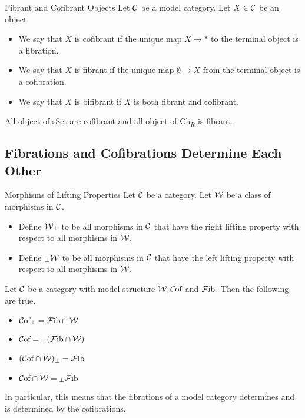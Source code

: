 \documentclass[a4paper]{article}
\begin{document}
\begin{defn}{Fibrant and Cofibrant Objects}{} Let $\mathcal{C}$ be a model category. Let $X\in\mathcal{C}$ be an object. 
\begin{itemize}
\item We say that $X$ is cofibrant if the unique map $X\to\ast$ to the terminal object is a fibration. 
\item We say that $X$ is fibrant if the unique map $\emptyset\to X$ from the terminal object is a cofibration. 
\item We say that $X$ is bifibrant if $X$ is both fibrant and cofibrant. 
\end{itemize}
\end{defn}

All object of sSet are cofibrant and all object of $\text{Ch}_R$ is fibrant. 

\subsection{Fibrations and Cofibrations Determine Each Other}
\begin{defn}{Morphisms of Lifting Properties}{} Let $\mathcal{C}$ be a category. Let $\mathcal{W}$ be a class of morphisms in $\mathcal{C}$. 
\begin{itemize}
\item Define $\mathcal{W}_\perp$ to be all morphisms in $\mathcal{C}$ that have the right lifting property with respect to all morphisms in $\mathcal{W}$. 
\item Define ${_\perp\mathcal{W}}$ to be all morphisms in $\mathcal{C}$ that have the left lifting property with respect to all morphisms in $\mathcal{W}$. 
\end{itemize}
\end{defn}

\begin{thm}{}{} Let $\mathcal{C}$ be a category with model structure $\mathcal{W},\mathcal{C}\text{of}$ and $\mathcal{F}\text{ib}$. Then the following are true. 
\begin{itemize}
\item $\mathcal{C}\text{of}_\perp=\mathcal{F}\text{ib}\cap\mathcal{W}$
\item $\mathcal{C}\text{of}={_\perp(\mathcal{F}\text{ib}\cap\mathcal{W})}$
\item $(\mathcal{C}\text{of}\cap\mathcal{W})_\perp=\mathcal{F}\text{ib}$
\item $\mathcal{C}\text{of}\cap\mathcal{W}={_\perp\mathcal{F}\text{ib}}$
\end{itemize}
In particular, this means that the fibrations of a model category determines and is determined by the cofibrations. 
\end{thm}
\end{document}
